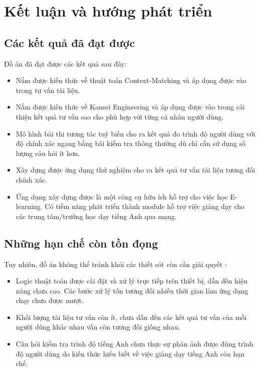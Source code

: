\def\baselinestretch{1}
\chapter{Kết luận và hướng phát triển} \label{KetLuan}

\section{Các kết quả đã đạt được}
Đồ án đã đạt được các kết quả sau đây:
\begin{itemize}
	\item Nắm được kiến thức về thuật toán Context-Matching và áp dụng được vào trong tư vấn tài liệu.
	\item Nắm được kiến thức về Kansei Engineering và áp dụng được vào trong cải thiện kết quả tư vấn sao cho phù hợp với từng cá nhân người dùng.
	\item Mô hình bài thi tương tác tuỳ biến cho ra kết quả đo trình độ người dùng với độ chính xác ngang bằng bài kiểm tra thông thường dù chỉ cần sử dụng số lượng câu hỏi ít hơn.
	\item Xây dựng được ứng dụng thử nghiệm cho ra kết quả tư vấn tài liệu tương đối chính xác.
	\item Ứng dụng xây dựng được là một công cụ hữu ích hỗ trợ cho việc học E-learning. Có tiềm năng phát triển thành module hỗ trợ việc giảng dạy cho các trung tâm/trường học dạy tiếng Anh qua mạng.
\end{itemize}

\section{Những hạn chế còn tồn đọng}
Tuy nhiên, đồ án không thể tránh khỏi các thiết sót còn cần giải quyết :
\begin{itemize}
	\item Logic thuật toán được cài đặt và xử lý trực tiếp trên thiết bị, dẫn đến hiệu năng chưa cao. Các bước xử lý tốn tương đối nhiều thời gian làm ứng dụng chạy chưa được mượt.
	\item Khối lượng tài liệu tư vấn còn ít, chưa dẫn đến các kết quả tư vấn của mỗi người dùng khác nhau vẫn còn tương đối giống nhau.
	\item Câu hỏi kiểm tra trình độ tiếng Anh chưa thực sự phản ánh được đúng trình độ người dùng do kiến thức hiểu biết về việc giảng dạy tiếng Anh còn hạn chế.
\end{itemize}

